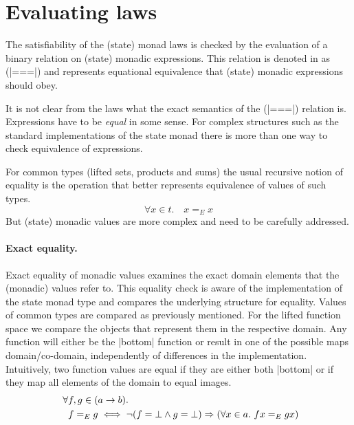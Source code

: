 
\section{Evaluating laws}
\label{sec:equalities}

The satisfiability of the (state) monad laws is checked by the
evaluation of a binary relation on (state) monadic expressions.
%
This relation is denoted in  as (|===|) and represents
equational equivalence that (state) monadic expressions should obey.


It is not clear from the laws what the exact semantics of the (|===|)
relation is.
%
Expressions have to be \emph{equal} in some sense.
%
For complex structures such as the standard implementations of the
state monad there is more than one way to check equivalence of
expressions.


For common types (lifted sets, products and sums) the usual recursive
notion of equality is the operation that better represents equivalence
of values of such types.
%
\[
\forall x \in t. \quad x =_E x
\]
But (state) monadic values are more complex and need to be carefully
addressed.


\paragraph{Exact equality.} %
Exact equality of monadic values examines the exact domain elements that
the (monadic) values refer to.
%
This equality check is aware of the implementation of the state monad
type and compares the underlying structure for equality.
%
Values of common types are compared as previously mentioned.
%
For the lifted function space we compare the objects that represent
them in the respective domain.
%
%
Any function will either be the |bottom| function or result in one of
the possible maps domain/co-domain, independently of differences in
the implementation.
%
Intuitively, two function values are equal if they are either both
|bottom| or if they map all elements of the domain to equal images.
%
\begin{align}
\forall & f, g \in (a \rightarrow b). \notag\\
\quad & f =_E g \iff \lnot (f = \bot \land g = \bot)
    \Rightarrow (\forall x \in a. \ f x =_E g x)
\notag
\end{align}


